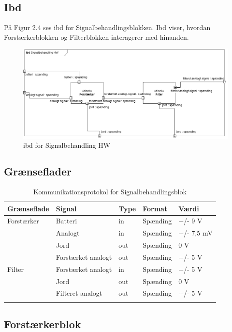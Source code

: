 \subsection{Ibd}
På Figur 2.4 ses ibd for Signalbehandlingsblokken. Ibd viser, hvordan Forstærkerblokken og Filterblokken interagerer med hinanden. 

\begin{figure}[H]
	\centering
	\includegraphics[width=1\textwidth]{Figurer/5}
	\caption{ibd for Signalbehandling HW}
	\label{fig:ibd hw}
\end{figure}

\subsection{Grænseflader}

\begin{longtabu} to 
	\textbf{Grænseflade} & \textbf{Signal} & \textbf{Type} & \textbf{Format} & \textbf{Værdi} \\[-1ex]
	\midrule
	Forstærker & Batteri & in & Spænding & +/- 9 V \\[-1ex]
			   & Analogt & in & Spænding & +/- 7,5 mV \\[-1ex]
			   & Jord	 & out & Spænding & 0 V \\[-1ex]
			   & Forstærket analogt & out & Spænding & +/- 5 V \\[-1ex]
	Filter	   & Forstærket analogt & in & Spænding & +/- 5 V\\[-1ex]
			   & Jord	 & out & Spænding & 0 V\\[-1ex]
			   & Filteret analogt & out & Spænding & +/- 5 V\\[-1ex]
	\caption{Kommunikationsprotokol for Signalbehandlingsblok}	
\end{longtabu}


 \subsection{Forstærkerblok}
